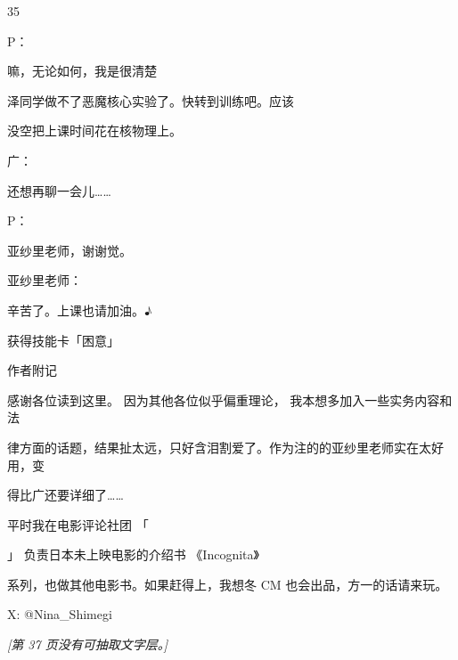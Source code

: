 35\par
P：\par
嘛，无论如何，我是很清楚\par
泽同学做不了恶魔核心实验了。快转到训练吧。应该\par
没空把上课时间花在核物理上。\par
广：\par
还想再聊一会儿……\par
P：\par
亚纱里老师，谢谢觉。\par
亚纱里老师：\par
辛苦了。上课也请加油。♪\par
获得技能卡「困意」\par
作者附记\par
感谢各位读到这里。 因为其他各位似乎偏重理论， 我本想多加入一些实务内容和法\par
律方面的话题，结果扯太远，只好含泪割爱了。作为注的的亚纱里老师实在太好用，变\par
得比广还要详细了……\par
平时我在电影评论社团 「\par
」 负责日本未上映电影的介绍书 《Incognita》\par
系列，也做其他电影书。如果赶得上，我想冬 CM 也会出品，方一的话请来玩。\par
X: @Nina\_Shimegi\par

\noindent\textit{[第 37 页没有可抽取文字层。]}\par

